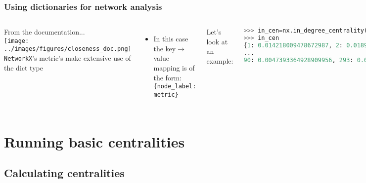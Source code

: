 \documentclass[xcolor=dvipsnames, 9pt]{beamer}
\begin{document}
\begin{frame}[fragile]
    \frametitle{Using dictionaries for network analysis}
    \begin{columns}
        From the documentation...\\ \vspace{3mm}
        \texttt{[image: ../images/figures/closeness\_doc.png]}
        \texttt{NetworkX}'s metric's make extensive use of the dict type
        \begin{itemize}
            \item In this case the key$\rightarrow$value mapping is of the form: \texttt{\{node\_label: metric\}} 
        \end{itemize}
        Let's look at an example:
        \begin{block}{}
            \scriptsize{\begin{lstlisting}[language=Python]
>>> in_cen=nx.in_degree_centrality(hartford)
>>> in_cen
{1: 0.014218009478672987, 2: 0.018957345971563982,...
...
90: 0.0047393364928909956, 293: 0.0}
            \end{lstlisting}}
        \end{block}
        We can see that node \#90 has in-degree centrality 0.0047
        \begin{itemize}
            \item But we can do so much more!
        \end{itemize}
    \end{columns}
\end{frame}



\section{Running basic centralities} %
\label{sec:running_basic_centralities}

\subsection{Calculating centralities} %
\label{sub:calculating_centralities}
\end{document}
